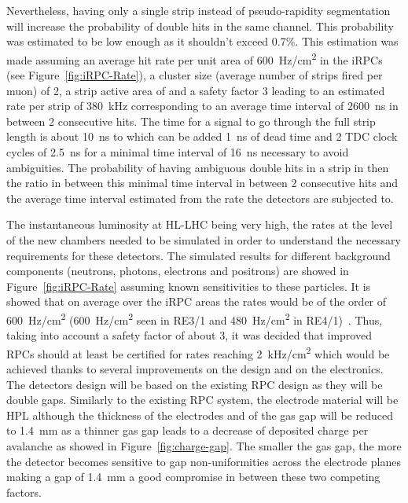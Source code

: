 	Nevertheless, having only a single strip instead of pseudo-rapidity segmentation will increase the probability of double hits in the same channel. This probability was estimated to be low enough as it shouldn't exceed 0.7\%. This estimation was made assuming an average hit rate per unit area of \SI{600}{Hz/cm^2} in the iRPCs (see Figure~\ref{fig:iRPC-Rate}), a cluster size (average number of strips fired per muon) of 2, a strip active area of  and a safety factor 3 leading to an estimated rate per strip of \SI{380}{kHz} corresponding to an average time interval of \SI{2600}{ns} in between 2 consecutive hits. The time for a signal to go through the full strip length is about \SI{10}{ns} to which can be added \SI{1}{ns} of dead time and 2 TDC clock cycles of \SI{2.5}{ns} for a minimal time interval of \SI{16}{ns} necessary to avoid ambiguities. The probability of having ambiguous double hits in a strip in then the ratio in between this minimal time interval in between 2 consecutive hits and the average time interval estimated from the rate the detectors are subjected to.
	
	The instantaneous luminosity at HL-LHC being very high, the rates at the level of the new chambers needed to be simulated in order to understand the necessary requirements for these detectors. The simulated results for different background components (neutrons, photons, electrons and positrons) are showed in Figure~\ref{fig:iRPC-Rate} assuming known sensitivities to these particles. It is showed that on average over the iRPC areas the rates would be of the order of \SI{600}{Hz/cm^2} (\SI{600}{Hz/cm^2} seen in RE3/1 and \SI{480}{Hz/cm^2} in RE4/1)~\cite{ANDREA2018}. Thus, taking into account a safety factor of about 3, it was decided that improved RPCs should at least be certified for rates reaching \SI{2}{kHz/cm^2} which would be achieved thanks to several improvements on the design and on the electronics. The detectors design will be based on the existing RPC design as they will be double gaps. Similarly to the existing RPC system, the electrode material will be HPL although the thickness of the electrodes and of the gas gap will be reduced to \SI{1.4}{mm} as a thinner gas gap leads to a decrease of deposited charge per avalanche as showed in Figure~\ref{fig:charge-gap}. The smaller the gas gap, the more the detector becomes sensitive to gap non-uniformities across the electrode planes making a gap of \SI{1.4}{mm} a good compromise in between these two competing factors.

